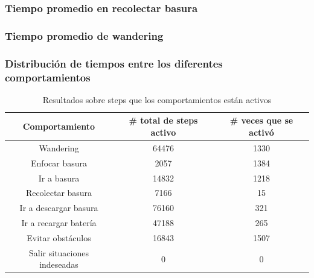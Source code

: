 \subsubsection{Tiempo promedio en recolectar basura}

\subsubsection{Tiempo promedio de wandering}

\subsubsection{Distribuci\'on de tiempos entre los diferentes comportamientos}

\begin{table}[ht]
	\begin{center}
		\begin{tabular}{|c|c|c|}
			\hline
			Comportamiento & \# total de steps activo & \# veces que se activ\'o \\
			\hline
			Wandering & 64476 & 1330 \\
			Enfocar basura & 2057 & 1384 \\
			Ir a basura & 14832 & 1218 \\
			Recolectar basura & 7166 & 15 \\
			Ir a descargar basura & 76160 & 321 \\
			Ir a recargar bater\'ia & 47188 & 265 \\
			Evitar obst\'aculos & 16843 & 1507 \\
			Salir situaciones indeseadas & 0 & 0 \\
			\hline
		\end{tabular}
	\end{center}
	\caption{Resultados sobre steps que los comportamientos est\'an activos }
	\label{behaviours_stats}
\end{table}

